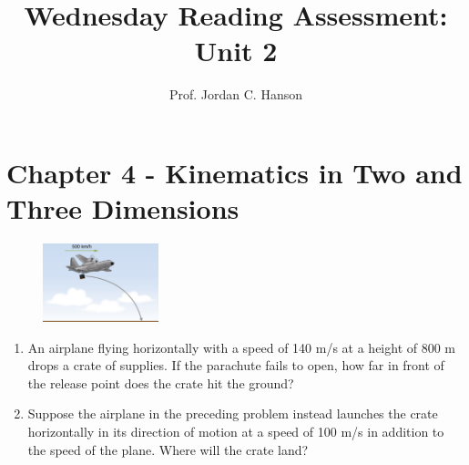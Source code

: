 \documentclass{article}
\begin{document}
\title{Wednesday Reading Assessment: Unit 2}
\author{Prof. Jordan C. Hanson}

\maketitle

\section{Chapter 4 - Kinematics in Two and Three Dimensions}

\begin{figure}[ht]
\centering
\includegraphics[width=0.3\textwidth]{plane.png}
\end{figure}

\begin{enumerate}
\item An airplane flying horizontally with a speed of 140 m/s at a height of 800 m drops a crate of supplies.  If the parachute fails to open, how far in front of the release point does the crate hit the ground? \\ \vspace{5cm}
\item Suppose the airplane in the preceding problem instead launches the crate horizontally in its direction of motion at a speed of 100 m/s in addition to the speed of the plane.  Where will the crate land?
\end{enumerate}
\end{document}

